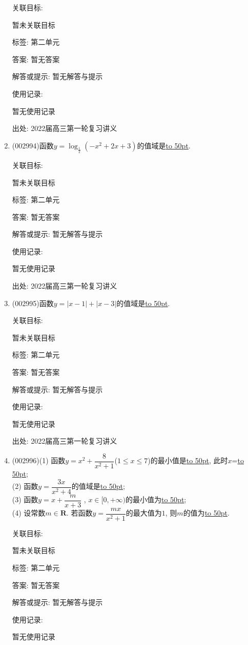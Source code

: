 \documentclass[10pt,a4paper]{article}
\newcommand{\blank}[1]{\underline{\hbox to #1pt{}}}
\begin{document}
\begin{enumerate}[1.]
关联目标:

暂未关联目标



标签: 第二单元

答案: 暂无答案

解答或提示: 暂无解答与提示

使用记录:

暂无使用记录


出处: 2022届高三第一轮复习讲义
\item { (002994)}函数$y=\log_{\frac 12}(-x^2+2x+3)$的值域是\blank{50}.


关联目标:

暂未关联目标



标签: 第二单元

答案: 暂无答案

解答或提示: 暂无解答与提示

使用记录:

暂无使用记录


出处: 2022届高三第一轮复习讲义
\item { (002995)}函数$y=|x-1|+|x-3|$的值域是\blank{50}.


关联目标:

暂未关联目标



标签: 第二单元

答案: 暂无答案

解答或提示: 暂无解答与提示

使用记录:

暂无使用记录


出处: 2022届高三第一轮复习讲义
\item { (002996)}(1) 函数$y=x^2+\dfrac 8{x^2+1}$($1\le x\le 7$)的最小值是\blank{50}, 此时$x$=\blank{50};\\
(2) 函数$y=\dfrac{3x}{x^2+4}$的值域是\blank{50};\\
(3) 函数$y=x+\dfrac m{x+3}$ , $x\in [0,+\infty)$的最小值为\blank{50};\\
(4) 设常数$m\in \mathbf{R}$. 若函数$y=\dfrac{mx}{x^2+1}$的最大值为$1$, 则$m$的值为\blank{50}.


关联目标:

暂未关联目标



标签: 第二单元

答案: 暂无答案

解答或提示: 暂无解答与提示

使用记录:

暂无使用记录



\end{enumerate}
\end{document}
